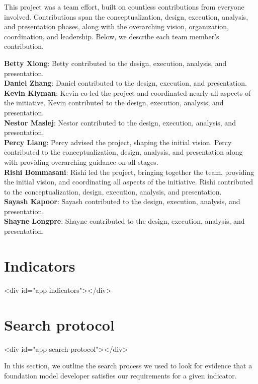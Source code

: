 \documentclass[screen, authorversion, acmsmall]{acmart}
\begin{document}
This project was a team effort, built on countless contributions from everyone involved. 
Contributions span the conceptualization, design, execution, analysis, and presentation phases, along with the overarching vision, organization, coordination, and leadership.
Below, we describe each team member's contribution.


\noindent 
\textbf{Betty Xiong}: Betty contributed to the design, execution, analysis, and presentation.
\\
\textbf{Daniel Zhang}: Daniel contributed to the design, execution, and presentation.
\\
\textbf{Kevin Klyman}: Kevin co-led the project and coordinated nearly all aspects of the initiative. Kevin contributed to the design, execution, analysis, and presentation. 
\\
\textbf{Nestor Maslej}: Nestor contributed to the design, execution, analysis, and presentation.
\\
\textbf{Percy Liang}: Percy advised the project, shaping the initial vision. Percy contributed to the conceptualization, design, analysis, and presentation along with providing overarching guidance on all stages. 
\\
\textbf{Rishi Bommasani}: Rishi led the project, bringing together the team, providing the initial vision, and coordinating all aspects of the initiative. Rishi contributed to the conceptualization, design, execution, analysis, and presentation. 
\\
\textbf{Sayash Kapoor}: Sayash contributed to the design, execution, analysis, and presentation.
\\
\textbf{Shayne Longpre}: Shayne contributed to the design, execution, analysis, and presentation.
\\
\pagebreak
\hypertarget{indicators}{\section{Indicators}}
<div id="app-indicators"></div>



\pagebreak
\hypertarget{search-protocol}{\section{Search protocol}}
<div id="app-search-protocol"></div>


In this section, we outline the search process we used to look for evidence that a foundation model developer satisfies our requirements for a given indicator. 
\end{document}
